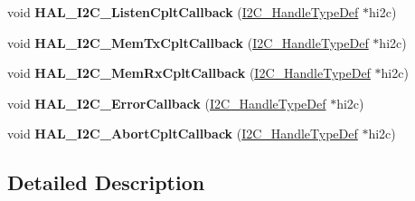 \begin{DoxyCompactItemize}
void {\bfseries H\+A\+L\+\_\+\+I2\+C\+\_\+\+Listen\+Cplt\+Callback} (\mbox{\hyperlink{struct_i2_c___handle_type_def}{I2\+C\+\_\+\+Handle\+Type\+Def}} $\ast$hi2c)
\item 
\mbox{\label{group___i2_c___exported___functions___group2_ga874f6104d2cdbced9f2ab6e941ec58f0}} 
void {\bfseries H\+A\+L\+\_\+\+I2\+C\+\_\+\+Mem\+Tx\+Cplt\+Callback} (\mbox{\hyperlink{struct_i2_c___handle_type_def}{I2\+C\+\_\+\+Handle\+Type\+Def}} $\ast$hi2c)
\item 
\mbox{\label{group___i2_c___exported___functions___group2_gac16a95413b35f05c5ce725fefd8531a5}} 
void {\bfseries H\+A\+L\+\_\+\+I2\+C\+\_\+\+Mem\+Rx\+Cplt\+Callback} (\mbox{\hyperlink{struct_i2_c___handle_type_def}{I2\+C\+\_\+\+Handle\+Type\+Def}} $\ast$hi2c)
\item 
\mbox{\label{group___i2_c___exported___functions___group2_ga4d5338cd64a656dfdc4154773bc4f05d}} 
void {\bfseries H\+A\+L\+\_\+\+I2\+C\+\_\+\+Error\+Callback} (\mbox{\hyperlink{struct_i2_c___handle_type_def}{I2\+C\+\_\+\+Handle\+Type\+Def}} $\ast$hi2c)
\item 
\mbox{\label{group___i2_c___exported___functions___group2_gaa4c2f59ea15698a1490401e5bbc3f296}} 
void {\bfseries H\+A\+L\+\_\+\+I2\+C\+\_\+\+Abort\+Cplt\+Callback} (\mbox{\hyperlink{struct_i2_c___handle_type_def}{I2\+C\+\_\+\+Handle\+Type\+Def}} $\ast$hi2c)
\end{DoxyCompactItemize}


\subsection{Detailed Description}
